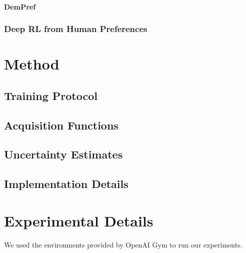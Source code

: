 \documentclass[11pt, a4paper, bibliography=totoc]{report}
\begin{document}
\subsubsection{DemPref}

\subsection{Deep RL from Human Preferences}

\chapter{Method}
\section{Training Protocol}

\section{Acquisition Functions}

\section{Uncertainty Estimates}

\section{Implementation Details}

\chapter{Experimental Details}
We used the environments provided by OpenAI Gym to run our experiments.
\end{document}
